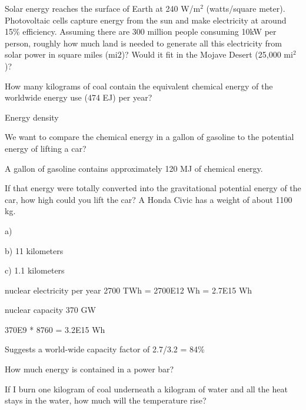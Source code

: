 \documentclass[12pt, oneside]{article}
\begin{document}
\problem{}
Solar energy reaches the surface of Earth at 240 W/m$^2$ (watts/square
meter). Photovoltaic cells capture energy from the sun and make
electricity at around 15\% efficiency. Assuming there are 300 million
people consuming 10kW per person, roughly how much land is needed to
generate all this electricity from solar power in square miles (mi$2$)?
Would it fit in the Mojave Desert (25,000 mi$^2$)?


\problem{}
How many kilograms of coal contain the equivalent chemical energy of the worldwide energy use (474 EJ) per year?


\problem{}

Energy density

We want to compare the chemical energy in a gallon of gasoline to the
potential energy of lifting a car?


A gallon of gasoline contains approximately 120 MJ of chemical energy.

\problem{}
If that energy were totally converted into the gravitational potential
energy of the car, how high could you lift the car?  A Honda Civic has a
weight of about 1100 kg.


a)

b) 11 kilometers

c) 1.1 kilometers







nuclear electricity per year 2700 TWh = 2700E12 Wh = 2.7E15 Wh

nuclear capacity 370 GW

370E9 * 8760 = 3.2E15 Wh

Suggests a world-wide capacity factor of 2.7/3.2 = 84\%


\problem{}
How much energy is contained in a power bar?


\problem{}

If I burn one kilogram of coal underneath a kilogram of water and all
the heat stays in the water, how much will the temperature rise?
\end{document}
